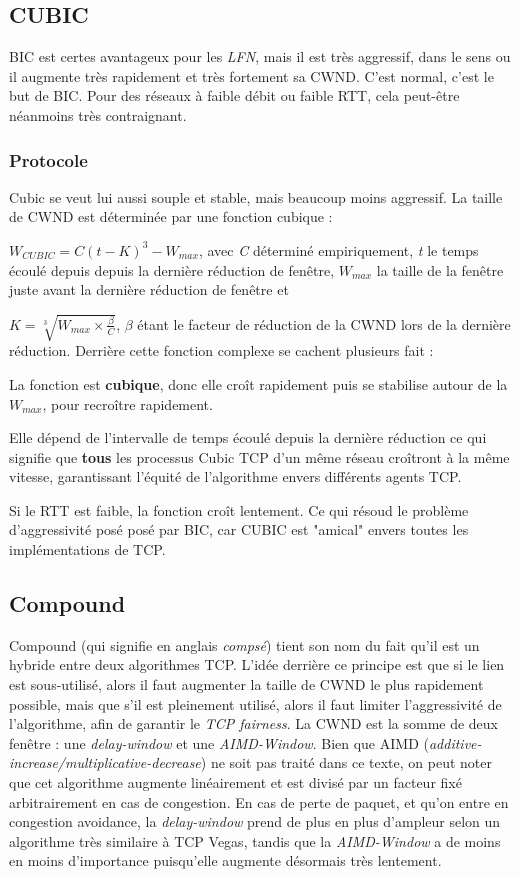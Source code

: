 \documentclass[	DIV=calc,%
							paper=a4,%
							fontsize=11pt,%
							twocolumn]{scrartcl}	 					%
\begin{document}
\subsection*{CUBIC}
BIC est certes avantageux pour les \textit{LFN}, mais il est très aggressif, dans le sens ou il augmente très rapidement et très fortement sa CWND. C'est normal, c'est le but de BIC. Pour des réseaux à faible débit ou faible RTT, cela peut-être néanmoins très contraignant.
\subsubsection*{Protocole}
Cubic se veut lui aussi souple et stable, mais beaucoup moins aggressif. La taille de CWND est déterminée par une fonction cubique : 

$W_{CUBIC} = C(t-K)^3 - W_{max}$, avec \textit{C} déterminé empiriquement, \textit{t} le temps écoulé depuis depuis la dernière réduction de fenêtre, $W_{max}$ la taille de la fenêtre juste avant la dernière réduction de fenêtre et 

$K = \sqrt[3]{W_{max}\times\frac{\beta}{C}}$, $\beta$ étant le facteur de réduction de la CWND lors de la dernière réduction.
Derrière cette fonction complexe se cachent plusieurs fait :
\begin{description}
\item{La fonction est \textbf{cubique}, donc elle croît rapidement puis se stabilise autour de la $W_{max}$, pour recroître rapidement.}
\item{Elle dépend de l'intervalle de temps écoulé depuis la dernière réduction ce qui signifie que \textbf{tous} les processus Cubic TCP d'un même réseau croîtront à la même vitesse, garantissant l'équité de l'algorithme envers différents agents TCP.}
\item{Si le RTT est faible, la fonction croît lentement. Ce qui résoud le problème d'aggressivité posé posé par BIC, car CUBIC est "amical" envers toutes les implémentations de TCP.} 	
\end{description}

\subsection*{Compound}
Compound (qui signifie en anglais \textit{compsé}) tient son nom du fait qu'il est un hybride entre deux algorithmes TCP. L'idée derrière ce principe est que si le lien est sous-utilisé, alors il faut augmenter la taille de CWND le plus rapidement possible, mais que s'il est pleinement utilisé, alors il faut limiter l'aggressivité de l'algorithme, afin de garantir le \textit{TCP fairness}.
La CWND est la somme de deux fenêtre : une \textit{delay-window} et une \textit{AIMD-Window}. Bien que AIMD (\textit{additive-increase/multiplicative-decrease}) ne soit pas traité dans ce texte, on peut noter que cet algorithme augmente linéairement et est divisé par un facteur fixé arbitrairement en cas de congestion. En cas de perte de paquet, et qu'on entre en congestion avoidance, la \textit{delay-window} prend de plus en plus d'ampleur selon un algorithme très similaire à TCP Vegas, tandis que la \textit{AIMD-Window} a de moins en moins d'importance puisqu'elle augmente désormais très lentement.
\end{document}
